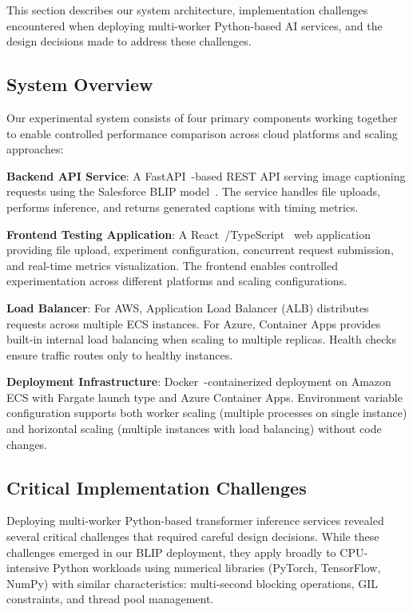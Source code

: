 This section describes our system architecture, implementation challenges encountered when deploying multi-worker Python-based AI services, and the design decisions made to address these challenges.

\subsection{System Overview}

Our experimental system consists of four primary components working together to enable controlled performance comparison across cloud platforms and scaling approaches:

\textbf{Backend API Service}: A FastAPI~\cite{fastapi2024}-based REST API serving image captioning requests using the Salesforce BLIP model~\cite{li2022blip}. The service handles file uploads, performs inference, and returns generated captions with timing metrics.

\textbf{Frontend Testing Application}: A React~\cite{react2024}/TypeScript~\cite{typescript2024} web application providing file upload, experiment configuration, concurrent request submission, and real-time metrics visualization. The frontend enables controlled experimentation across different platforms and scaling configurations.

\textbf{Load Balancer}: For AWS, Application Load Balancer (ALB) distributes requests across multiple ECS instances. For Azure, Container Apps provides built-in internal load balancing when scaling to multiple replicas. Health checks ensure traffic routes only to healthy instances.

\textbf{Deployment Infrastructure}: Docker~\cite{docker2024}-containerized deployment on Amazon ECS with Fargate launch type and Azure Container Apps. Environment variable configuration supports both worker scaling (multiple processes on single instance) and horizontal scaling (multiple instances with load balancing) without code changes.

\subsection{Critical Implementation Challenges}

Deploying multi-worker Python-based transformer inference services revealed several critical challenges that required careful design decisions. While these challenges emerged in our BLIP deployment, they apply broadly to CPU-intensive Python workloads using numerical libraries (PyTorch, TensorFlow, NumPy) with similar characteristics: multi-second blocking operations, GIL constraints, and thread pool management.

